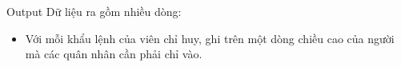 Output
Dữ liệu ra gồm nhiều dòng:  
\begin{itemize}
	\item     Với mỗi khẩu lệnh của viên chỉ huy, ghi trên một dòng  chiều cao của người mà các quân nhân cần phải chỉ vào.   
\end{itemize}